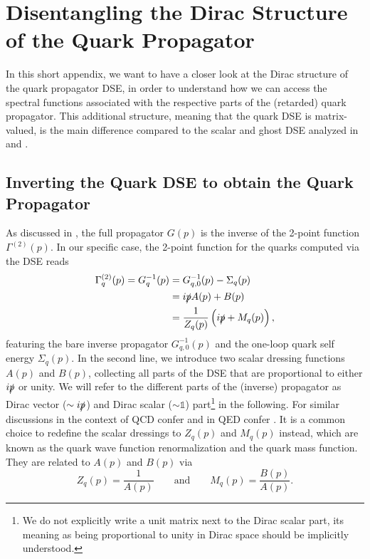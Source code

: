 \chapter{Disentangling the Dirac Structure of the Quark Propagator}\label{chap:appendixB}
In this short appendix, we want to have a closer look at the Dirac structure of the quark propagator DSE, in order to understand how we can access the spectral functions associated with the respective parts of the (retarded) quark propagator. This additional structure, meaning that the quark DSE is matrix-valued, is the main difference compared to the scalar and ghost DSE analyzed in \cite{HorakPawlowskiWink2020} and \cite{HorakPapavassiliouPawlowskiWink2021}.
\section*{Inverting the Quark DSE to obtain the Quark Propagator}
As discussed in , the full propagator $G(p)$ is the inverse of the 2-point function $\Gamma^{(2)}(p)$. In our specific case, the 2-point function for the quarks computed via the DSE reads
\begin{equation}
\begin{aligned}
		\Gamma^{(2)}_q(p) = G^{-1}_q(p) &= G_{q,0}^{-1}(p) - \Sigma_q(p) \\
		&= i\slashed{p} A(p) + B(p) \\
		&= \frac{1}{Z_q(p)}\left(i\slashed{p} + M_q(p)\right),
\end{aligned}
\end{equation}
featuring the bare inverse propagator $G_{q,0}^{-1}(p)$ and the one-loop quark self energy $\Sigma_q(p)$. In the second line, we introduce two scalar dressing functions $A(p)$ and $B(p)$, collecting all parts of the DSE that are proportional to either $i\slashed{p}$ or unity. We will refer to the different parts of the (inverse) propagator as Dirac vector ($\sim i\slashed{p}$) and Dirac scalar ($\sim \mathbb{1}$) part\footnote{We do not explicitly write a unit matrix next to the Dirac scalar part, its meaning as being proportional to unity in Dirac space should be implicitly understood.} in the following. For similar discussions in the context of QCD confer \cite{Solis2019} and in QED  confer \cite{JiaPennington2017}. 
It is a common choice to redefine the scalar dressings to $Z_q(p)$ and $M_q(p)$ instead, which are known as the quark wave function renormalization and the quark mass function. They are related to $A(p)$ and $B(p)$ via
\begin{equation}
	 Z_q(p) = \frac{1}{A(p)}\qquad \text{and}\qquad M_q(p) = \frac{B(p)}{A(p)}.
\end{equation}
